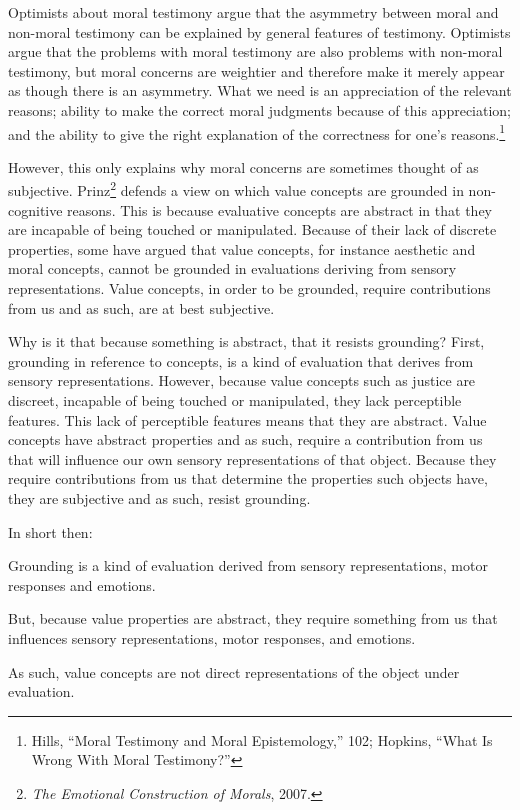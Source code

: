 \documentclass[phdthesis,12pt,final,a4paper]{wuthesis}
\theoremstyle{definition}
\theoremstyle{definition}
\theoremstyle{definition}
\theoremstyle{definition}
\theoremstyle{remark}
\begin{document}
Optimists about moral testimony argue that the asymmetry between moral and non-moral testimony can be explained by general features of testimony. Optimists argue that the problems with moral testimony are also problems with non-moral testimony, but moral concerns are weightier and therefore make it merely appear as though there is an asymmetry. What we need is an appreciation of the relevant reasons; ability to make the correct moral judgments because of this appreciation; and the ability to give the right explanation of the correctness for one's reasons.\footnote{Hills, {``Moral Testimony and Moral Epistemology,''} 102; Hopkins, {``What {Is Wrong With Moral Testimony}?''}}

However, this only explains why moral concerns are sometimes thought of as subjective. Prinz\footnote{\emph{The {Emotional Construction} of {Morals}}, 2007.} defends a view on which value concepts are grounded in non-cognitive reasons. This is because evaluative concepts are abstract in that they are incapable of being touched or manipulated. Because of their lack of discrete properties, some have argued that value concepts, for instance aesthetic and moral concepts, cannot be grounded in evaluations deriving from sensory representations. Value concepts, in order to be grounded, require contributions from us and as such, are at best subjective.

Why is it that because something is abstract, that it resists grounding? First, grounding in reference to concepts, is a kind of evaluation that derives from sensory representations. However, because value concepts such as justice are discreet, incapable of being touched or manipulated, they lack perceptible features. This lack of perceptible features means that they are abstract. Value concepts have abstract properties and as such, require a contribution from us that will influence our own sensory representations of that object. Because they require contributions from us that determine the properties such objects have, they are subjective and as such, resist grounding.

In short then:

Grounding is a kind of evaluation derived from sensory representations, motor responses and emotions.

But, because value properties are abstract, they require something from us that influences sensory representations, motor responses, and emotions.

As such, value concepts are not direct representations of the object under evaluation.
\end{document}
